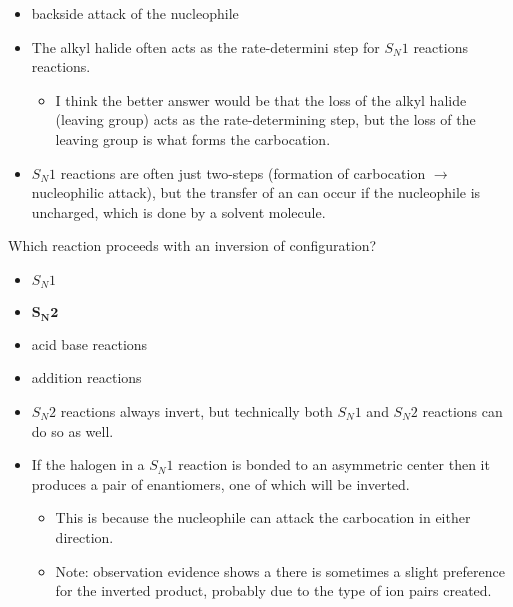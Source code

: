 \documentclass[12pt,a4paper]{article}
\begin{document}
\begin{enumerate}
{\begin{itemize}
        \item backside attack of the nucleophile
    \end{itemize}}
        \begin{itemize}
            \item The alkyl halide often acts as the rate-determini step for \(S_N1\) reactions reactions.
                \begin{itemize}
                    \item I think the better answer would be that the loss of the alkyl halide (leaving group) acts as the rate-determining step, but the loss of the leaving group is what forms the carbocation.
                \end{itemize}
            \item \(S_N1\) reactions are often just two-steps (formation of carbocation $\rightarrow$ nucleophilic attack), but the transfer of an  can occur if the nucleophile is uncharged, which is done by a solvent molecule. 
        \end{itemize}
    {\color{G-Moon}\item Which reaction proceeds with an inversion of configuration?
    \begin{itemize}
        \item \(S_N1\)
        \item {\color{o-Sun}\textbf{\(\bm{S_N2}\)}}
        \item acid base reactions
        \item addition reactions
    \end{itemize}}
        \begin{itemize}
            \item \(S_N2\) reactions always invert, but technically both \(S_N1\) and \(S_N2\) reactions can do so as well.
            \item If the halogen in a \(S_N1\) reaction is bonded to an asymmetric center then it produces a pair of enantiomers, one of which will be inverted.
                \begin{itemize}
                    \item This is because the nucleophile can attack the carbocation in either direction. 
                    \item Note: observation evidence shows a there is sometimes a slight preference for the inverted product, probably due to the type of ion pairs created.
                \end{itemize}
        \end{itemize}

\end{enumerate}
\end{document}
